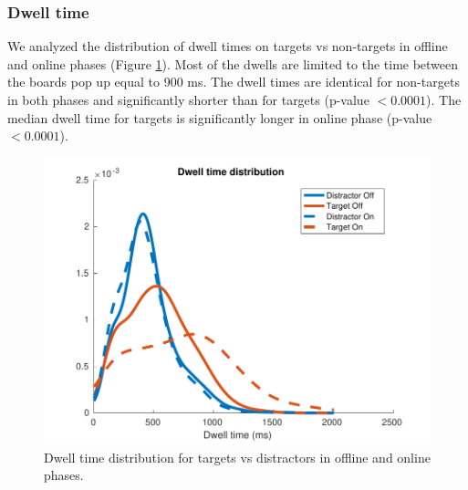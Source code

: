 \documentclass[12pt]{iopart}
\begin{document}
\subsubsection*{Dwell time}
We analyzed the distribution of dwell times on targets vs non-targets
in offline and online phases (Figure \ref{fig:dwell}). 
Most of the dwells are limited to the time between the boards pop up equal to 900 ms.
The dwell times are identical for non-targets in both phases and significantly
shorter than for targets (p-value $< 0.0001$).
The median dwell time for targets is significantly longer in online phase (p-value $< 0.0001$).

\begin{figure}[!t]
    \includegraphics[trim={0cm 0cm 0cm 0cm},clip,width=0.6\columnwidth]{../images/DwelltimeDist_online_allmean.pdf}
    \caption{Dwell time distribution for targets vs distractors in offline and online phases.}
\label{fig:dwell}
\end{figure}
\end{document}
